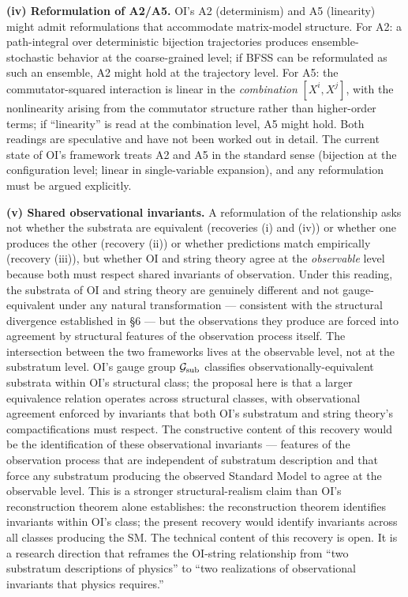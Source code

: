 \documentclass[
]{article}
\begin{document}
\textbf{(iv) Reformulation of A2/A5.} OI's A2 (determinism) and A5
(linearity) might admit reformulations that accommodate matrix-model
structure. For A2: a path-integral over deterministic bijection
trajectories produces ensemble-stochastic behavior at the coarse-grained
level; if BFSS can be reformulated as such an ensemble, A2 might hold at
the trajectory level. For A5: the commutator-squared interaction is
linear in the \emph{combination} \([X^i, X^j]\), with the nonlinearity
arising from the commutator structure rather than higher-order terms; if
``linearity'' is read at the combination level, A5 might hold. Both
readings are speculative and have not been worked out in detail. The
current state of OI's framework treats A2 and A5 in the standard sense
(bijection at the configuration level; linear in single-variable
expansion), and any reformulation must be argued explicitly.

\textbf{(v) Shared observational invariants.} A reformulation of the
relationship asks not whether the substrata are equivalent (recoveries
(i) and (iv)) or whether one produces the other (recovery (ii)) or
whether predictions match empirically (recovery (iii)), but whether OI
and string theory agree at the \emph{observable} level because both must
respect shared invariants of observation. Under this reading, the
substrata of OI and string theory are genuinely different and not
gauge-equivalent under any natural transformation --- consistent with
the structural divergence established in §6 --- but the observations
they produce are forced into agreement by structural features of the
observation process itself. The intersection between the two frameworks
lives at the observable level, not at the substratum level. OI's gauge
group \(\mathcal{G}_{\rm sub}\) classifies observationally-equivalent
substrata within OI's structural class; the proposal here is that a
larger equivalence relation operates across structural classes, with
observational agreement enforced by invariants that both OI's substratum
and string theory's compactifications must respect. The constructive
content of this recovery would be the identification of these
observational invariants --- features of the observation process that
are independent of substratum description and that force any substratum
producing the observed Standard Model to agree at the observable level.
This is a stronger structural-realism claim than OI's reconstruction
theorem alone establishes: the reconstruction theorem identifies
invariants within OI's class; the present recovery would identify
invariants across all classes producing the SM. The technical content of
this recovery is open. It is a research direction that reframes the
OI-string relationship from ``two substratum descriptions of physics''
to ``two realizations of observational invariants that physics
requires.''
\end{document}
